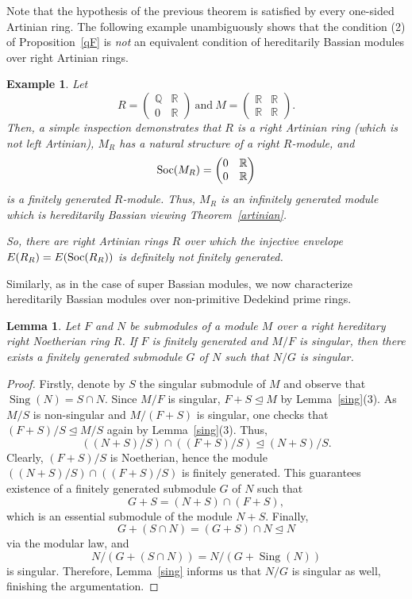 \documentclass{amsart}
\newtheorem{lm}[thm]{Lemma}
\newtheorem{exm}[thm]{Example}
\theoremstyle{definition}
\newcommand{\Q}{\mathbb{Q}}
\newcommand{\R}{\mathbb{R}}
\DeclareMathOperator{\Sing}{{Sing}}
\DeclareMathOperator{\Soc}{\rm Soc}
\begin{document}
Note that the hypothesis of the previous theorem is satisfied by every one-sided Artinian ring. The following example unambiguously shows that the condition (2) of Proposition~\ref{qF} is {\it not} an equivalent condition of hereditarily Bassian modules over right Artinian rings.

\begin{exm} Let $$R=\begin{pmatrix} \Q&\R\\0&\R\end{pmatrix} ~ \text{and} ~ M=\begin{pmatrix} \R&\R\\ \R&\R\end{pmatrix}.$$ Then, a simple inspection demonstrates that $R$ is a right Artinian ring (which is not left Artinian), $M_R$ has a natural structure of a right $R$-module, and $$\Soc(M_R)=\begin{pmatrix} 0&\R\\ 0&\R\end{pmatrix}$$ is a finitely generated $R$-module. Thus, $M_R$ is an infinitely generated module which is hereditarily Bassian viewing Theorem~\ref{artinian}.

So, there are right Artinian rings $R$ over which the injective envelope $E(R_R)=E(\Soc(R_R))$ is definitely not finitely generated.
\end{exm}

Similarly, as in the case of super Bassian modules, we now characterize hereditarily Bassian modules over non-primitive Dedekind prime rings.

\begin{lm}\label{hereditarily} Let $F$ and $N$ be submodules of a module $M$ over a right hereditary right Noetherian ring $R$. If $F$ is finitely generated and $M/F$ is singular, then there exists a finitely generated submodule $G$ of $N$ such that $N/G$ is singular.
\end{lm}

\begin{proof} Firstly, denote by $S$ the singular submodule of $M$ and observe that $\Sing(N)=S\cap N$. Since $M/F$ is singular, $F+S\trianglelefteq M$ by Lemma~\ref{sing}(3). As $M/S$ is non-singular and $M/(F+S)$ is singular, one checks that $(F+S)/S\trianglelefteq M/S$ again by Lemma~\ref{sing}(3). Thus,
\[
((N+S)/S)\cap ((F+S)/S) \trianglelefteq (N+S)/S.
\]
Clearly, $(F+S)/S$ is Noetherian, hence the module $((N+S)/S)\cap ((F+S)/S)$ is finitely generated. This guarantees existence of a finitely generated submodule $G$ of $N$ such that $$G+S=(N+S)\cap (F+S),$$ which is an essential submodule of the module $N+S$. Finally, $$G+(S\cap N)=(G+S)\cap N\trianglelefteq N$$ via the modular law, and $$N/(G+(S\cap N))= N/(G+\Sing(N))$$ is singular. Therefore, Lemma~\ref{sing} informs us that $N/G$ is singular as well, finishing the argumentation.
\end{proof}
\end{document}
